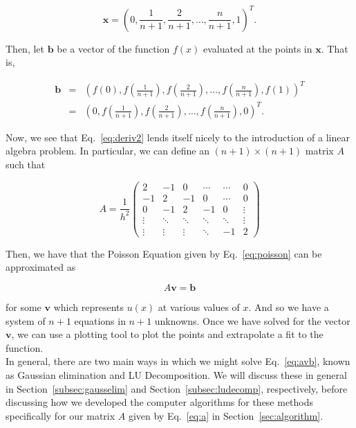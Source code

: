 \documentclass[12pt]{article}
\numberwithin{equation}{section}
\begin{document}
$$\textbf{x} = \left(0,\frac{1}{n+1},\frac{2}{n+1},\ldots,\frac{n}{n+1},1\right)^{T}.$$

\noindent Then, let $\textbf{b}$ be a vector of the function $f\left(x\right)$ evaluated at the points in $\textbf{x}$.  That is,

$$\begin{array}{ccc}\textbf{b} &=& \left(f\left(0\right),f\left(\frac{1}{n+1}\right),f\left(\frac{2}{n+1}\right),\ldots,f\left(\frac{n}{n+1}\right),f\left(1\right)\right)^{T} \\
&=& \left(0,f\left(\frac{1}{n+1}\right),f\left(\frac{2}{n+1}\right),\ldots,f\left(\frac{n}{n+1}\right),0\right)^{T}.
\end{array}$$

\noindent Now, we see that Eq.~\ref{eq:deriv2} lends itself nicely to the introduction of a linear algebra problem.  In particular, we can define an $\left(n+1\right)\times \left(n+1\right)$ matrix $A$ such that

\begin{equation}
\label{eq:a}
A = \frac{1}{h^{2}} \left(
\begin{array}{cccccc}
2 & -1 & 0 & \cdots & \cdots & 0 \\
-1 & 2 & -1 & 0 & \cdots & 0 \\
0 & -1 & 2 & -1 & 0 & \vdots \\
\vdots & \ddots & \ddots & \ddots & \ddots & \vdots \\
\vdots & \vdots & \vdots & \ddots & -1 & 2
\end{array}
\right)
\end{equation}

\noindent Then, we have that the Poisson Equation given by Eq.~\ref{eq:poisson} can be approximated as 

\begin{equation}
\label{eq:avb}
A\textbf{v}=\textbf{b}
\end{equation}

\noindent for some $\textbf{v}$ which represents $u\left(x\right)$ at various values of $x$.  And so we have a system of $n+1$ equations in $n+1$ unknowns.  Once we have solved for the vector $\textbf{v}$, we can use a plotting tool to plot the points and extrapolate a fit to the function.
\\\indent In general, there are two main ways in which we might solve  Eq.~\ref{eq:avb}, known as Gaussian elimination and LU Decomposition.  We will discuss these in general in Section~\ref{subsec:gausselim} and Section~\ref{subsec:ludecomp}, respectively, before discussing how we developed the computer algorithms for these methods specifically for our matrix $A$ given by Eq.~\ref{eq:a} in Section~\ref{sec:algorithm}.
\end{document}
